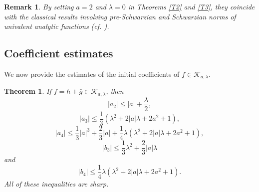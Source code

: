 \documentclass[11pt, reqno]{amsart}
\newtheorem{theorem}{Theorem}
\newtheorem{rem}{Remark}
\numberwithin{equation}{section}
\newcommand{\abs}[1]{\left\vert#1\right\vert}
\begin{document}
   \begin{rem}
{\rm By setting $a=2$ and $\lambda=0$ in Theorems \ref{T2} and \ref{T3}, they coincide with the classical results
 involving pre-Schwarzian and Schwarzian norms of univalent analytic functions (cf. \cite{b}).}
\end{rem}



\subsection{Coefficient estimates}
We now provide the estimates of the initial coefficients of $f\in\mathcal{K}_{a,\lambda}$.  
\begin{theorem}\label{T4}
	If $f=h+\bar{g}\in\mathcal{K}_{a,\lambda}$, then %
    $$|a_2|\leq|a|+\frac{\lambda}{2},$$ 
	$$|a_3|\leq\dfrac{1}{3}\left(\lambda^2+2\abs{a}\lambda+2a^2+1\right),$$
	$$|a_4|\leq\dfrac{1}{3}\abs{a}^3+\dfrac{2}{3}\abs{a}+
        \dfrac{1}{4}\lambda\left(\lambda^2+2\abs{a}\lambda+2a^2+1\right),$$
    $$|b_3|\leq\dfrac{1}{3}\lambda^2+\dfrac{2}{3}\abs{a}\lambda$$
and $$|b_4|\leq\dfrac{1}{4}\lambda\left(\lambda^2+2\abs{a}\lambda+2a^2+1\right).$$
All of these inequalities are sharp.
\end{theorem}
\end{document}
